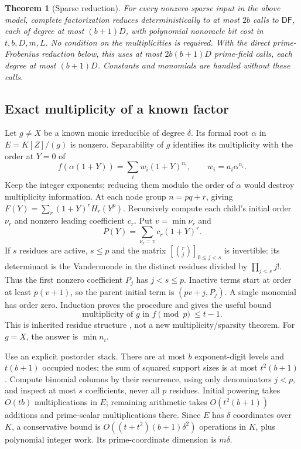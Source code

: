 \documentclass[11pt]{article}
\newtheorem{theorem}{Theorem}
\begin{document}
\begin{theorem}[Sparse reduction]
For every nonzero sparse input in the above model, complete factorization
reduces deterministically to at most $2b$ calls to $\mathsf{DF}$, each
of degree at most $(b+1)D$, with polynomial nonoracle bit cost in
$t,b,D,m,L$. No condition on the multiplicities is required.
With the direct prime-Frobenius reduction below, this uses at most
$2b(b+1)D$ prime-field calls, each degree at most $(b+1)D$.
Constants and monomials are handled without these calls.
\end{theorem}

\subsection{Exact multiplicity of a known factor}
Let $g\ne X$ be a known monic irreducible of degree $\delta$.
Its formal root $\alpha$ in $E=K[Z]/(g)$ is nonzero. Separability of $g$
identifies its multiplicity with the order at $Y=0$ of
\[
 f(\alpha(1+Y))=\sum_i w_i(1+Y)^{n_i},\qquad
 w_i=a_i\alpha^{n_i}.
\]
Keep the integer exponents; reducing them modulo the order of $\alpha$
would destroy multiplicity information. At each node group $n=pq+r$,
giving $F(Y)=\sum_r(1+Y)^rH_r(Y^p)$. Recursively compute each child's
initial order $\nu_r$ and nonzero leading coefficient $c_r$. Put
$v=\min\nu_r$ and
\[
 P(Y)=\sum_{\nu_r=v}c_r(1+Y)^r.
\]
If $s$ residues are active, $s\le p$ and the matrix
$[\binom rj]_{0\le j<s}$ is invertible: its determinant is the
Vandermonde in the distinct residues divided by $\prod_{j<s}j!$.
Thus the first nonzero coefficient $P_j$ has $j<s\le p$.
Inactive terms start at order at least $p(v+1)$, so the parent initial
term is $(pv+j,P_j)$. A single monomial has order zero. Induction proves
the procedure and gives the useful bound
\begin{equation}\label{eq:residuebound}
 \text{multiplicity of }g\text{ in }f\pmod p\ \le t-1.
\end{equation}
This is inherited residue structure \cite{Mattarei07}, not a new
multiplicity/sparsity theorem. For $g=X$, the answer is $\min n_i$.

Use an explicit postorder stack. There are at most $b$ exponent-digit
levels and $t(b+1)$ occupied nodes; the sum of squared support sizes
is at most $t^2(b+1)$. Compute binomial columns by their recurrence,
using only denominators $j<p$, and inspect at most $s$ coefficients,
never all $p$ residues. Initial powering takes $O(tb)$ multiplications
in $E$; remaining arithmetic takes $O(t^2(b+1))$ additions and prime-scalar
multiplications there. Since $E$ has $\delta$ coordinates over $K$,
a conservative bound is $O((t+t^2)(b+1)\delta^2)$ operations in $K$,
plus polynomial integer work. Its prime-coordinate dimension is $m\delta$.
\end{document}

